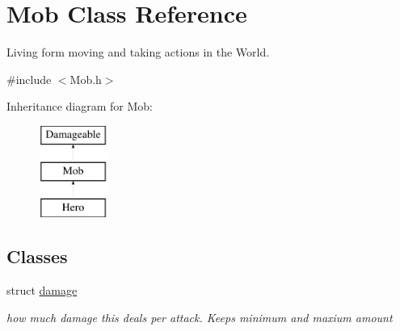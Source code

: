 \hypertarget{class_mob}{}\section{Mob Class Reference}
\label{class_mob}


Living form moving and taking actions in the World.  




{\ttfamily \#include $<$Mob.\+h$>$}

Inheritance diagram for Mob\+:\begin{figure}[H]
\begin{center}
\leavevmode
\includegraphics[height=3.000000cm]{class_mob}
\end{center}
\end{figure}
\subsection*{Classes}
\begin{DoxyCompactItemize}
\item 
struct \hyperlink{struct_mob_1_1damage}{damage}
\begin{DoxyCompactList}\small\item\em how much damage this deals per attack. Keeps minimum and maxium amount \end{DoxyCompactList}\end{DoxyCompactItemize}
